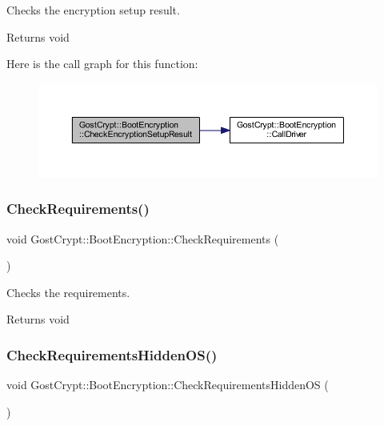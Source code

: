 Checks the encryption setup result. 

\begin{DoxyReturn}{Returns}
void 
\end{DoxyReturn}
Here is the call graph for this function\+:
\nopagebreak
\begin{figure}[H]
\begin{center}
\leavevmode
\includegraphics[width=350pt]{class_gost_crypt_1_1_boot_encryption_ac584bf7946ae3ac2d35fb38fcfbb615a_cgraph}
\end{center}
\end{figure}
\mbox{\label{class_gost_crypt_1_1_boot_encryption_a1c573946faa2ec5b1bcbeae56d8320f9}} 
\subsubsection{\texorpdfstring{Check\+Requirements()}{CheckRequirements()}}
{\footnotesize\ttfamily void Gost\+Crypt\+::\+Boot\+Encryption\+::\+Check\+Requirements (\begin{DoxyParamCaption}{ }\end{DoxyParamCaption})}



Checks the requirements. 

\begin{DoxyReturn}{Returns}
void 
\end{DoxyReturn}
\mbox{\label{class_gost_crypt_1_1_boot_encryption_af8f44624d785fff7ce9e8078d71f03a6}} 
\subsubsection{\texorpdfstring{Check\+Requirements\+Hidden\+O\+S()}{CheckRequirementsHiddenOS()}}
{\footnotesize\ttfamily void Gost\+Crypt\+::\+Boot\+Encryption\+::\+Check\+Requirements\+Hidden\+OS (\begin{DoxyParamCaption}{ }\end{DoxyParamCaption})}



